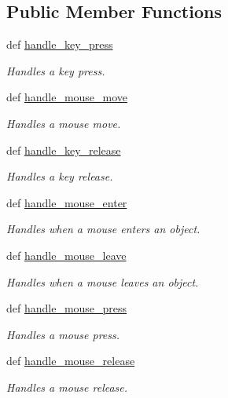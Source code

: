 \subsection*{Public Member Functions}
\begin{DoxyCompactItemize}
\item 
def \hyperlink{classtest_1_1Handler_a3d418670cfafce344b8b7155b4df438e}{handle\_\-key\_\-press}
\begin{DoxyCompactList}\small\item\em Handles a key press. \item\end{DoxyCompactList}\item 
def \hyperlink{classtest_1_1Handler_a88a2d58962eb4bf7338332848fa5fc3a}{handle\_\-mouse\_\-move}
\begin{DoxyCompactList}\small\item\em Handles a mouse move. \item\end{DoxyCompactList}\item 
def \hyperlink{classcs110graphics_1_1EventHandler_a2849f60251baa44252992162521f2473}{handle\_\-key\_\-release}
\begin{DoxyCompactList}\small\item\em Handles a key release. \item\end{DoxyCompactList}\item 
def \hyperlink{classcs110graphics_1_1EventHandler_a13af3268f8a1aa36b8483eb2deffef15}{handle\_\-mouse\_\-enter}
\begin{DoxyCompactList}\small\item\em Handles when a mouse enters an object. \item\end{DoxyCompactList}\item 
def \hyperlink{classcs110graphics_1_1EventHandler_a5deaf2b6b8055e97ac0ddf6603132c64}{handle\_\-mouse\_\-leave}
\begin{DoxyCompactList}\small\item\em Handles when a mouse leaves an object. \item\end{DoxyCompactList}\item 
def \hyperlink{classcs110graphics_1_1EventHandler_a547873123ebcd3fcc63a2e03d2a2fee3}{handle\_\-mouse\_\-press}
\begin{DoxyCompactList}\small\item\em Handles a mouse press. \item\end{DoxyCompactList}\item 
def \hyperlink{classcs110graphics_1_1EventHandler_a320a7dbf68d37e0101b237bff1713088}{handle\_\-mouse\_\-release}
\begin{DoxyCompactList}\small\item\em Handles a mouse release. \item\end{DoxyCompactList}\end{DoxyCompactItemize}


